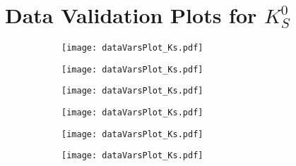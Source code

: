 \chapter{Data Validation Plots for $K_S^0$}

\begin{figure}[H]
	\caption{The distribution of variables used in KsFinder classification. The variables abbreviation can be referenced from Table III. The yellow solid lines are $K_S^0$ from data without KsFinder, and red solid lines are $K_S^0$ with KsFinder using MC13a for training.  The black dashed lines are $K_S^0$ with KsFinder using MC12b (run-dependent). Blue histogram is from MC13a without KsFinder and cyan histogram is from MC13a with KsFinder.}
\begin{subfigure}{0.5\linewidth}
	\texttt{[image: dataVarsPlot\_Ks.pdf]}
\end{subfigure}
\begin{subfigure}{0.5\linewidth}
		\texttt{[image: dataVarsPlot\_Ks.pdf]}
\end{subfigure}
\begin{subfigure}{0.5\linewidth}
		\texttt{[image: dataVarsPlot\_Ks.pdf]}
\end{subfigure}
\begin{subfigure}{0.5\linewidth}
		\texttt{[image: dataVarsPlot\_Ks.pdf]}
\end{subfigure}
\begin{subfigure}{0.5\linewidth}
		\texttt{[image: dataVarsPlot\_Ks.pdf]}
\end{subfigure}
\begin{subfigure}{0.5\linewidth}
	\texttt{[image: dataVarsPlot\_Ks.pdf]}
\end{subfigure}
\end{figure}
